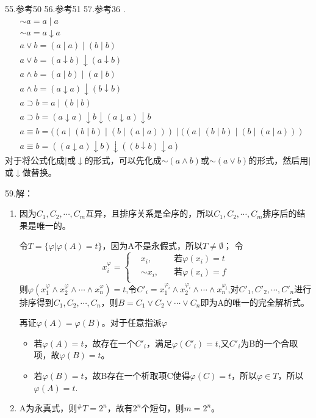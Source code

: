 \documentclass[a4paper]{ctexart}
\begin{document}
\noindent 55.参考50\newline
\noindent 56.参考51\newline
\noindent 57.参考36\newline
{}.
\begin{align*}
  &\sim a = a\mid a \\ 
  &\sim a = a \downarrow a\\
  &a\vee b = (a\mid a)\mid (b\mid b) \\
  &a\vee b =(a\downarrow b)\downarrow(a\downarrow b)\\
  &a\wedge b=(a\mid b)\mid (a\mid b) \\
  &a\wedge b=(a\downarrow a)\downarrow(b\downarrow b) \\
  &a\supset b=a\mid(b\mid b) \\ 
  &a\supset b=(a\downarrow a)\downarrow b\downarrow (a\downarrow a)\downarrow b \\
  &a\equiv b = ((a\mid(b\mid b)\mid(b\mid(a\mid a)))\mid ((a\mid(b\mid b)\mid(b\mid(a\mid a))) \\
  &a\equiv b = ((a\downarrow a)\downarrow b)\downarrow((b\downarrow b)\downarrow a)
\end{align*}
对于将公式化成$\mid$或$\downarrow$的形式，可以先化成$\sim(a\wedge b)$或$\sim(a\vee b)$的形式，然后用$\mid$或$\downarrow$做替换。\newline

\noindent 59.解：
\begin{enumerate}
  \item 因为$C_1,C_2,\cdots,C_m$互异，且排序关系是全序的，所以$C_1,C_2,\cdots,C_m$排序后的结果是唯一的。
  
  令$T=\{\varphi|\varphi(A)=t\}$，因为A不是永假式，所以$T\neq \emptyset$；
  令$$x_i^\varphi=
  \left\{
    \begin{aligned}
      &x_i,\quad &\text{若}\varphi(x_i)=t\\
      &\sim x_i, \quad &\text{若}\varphi(x_i)=f\\
    \end{aligned}
  \right.
  $$
  则$\varphi(x_1^\varphi\wedge x_2^\varphi\wedge\cdots \wedge x_n^\varphi)=t$,令$C'_i=x_1^{\varphi_i}\wedge x_2^{\varphi_i}\wedge\cdots \wedge x_n^{\varphi_i}$,对$C'_1,C'_2,\cdots,C'_n$进行排序得到$C_1,C_2,\cdots,C_n$，则$B=C_1\vee C_2\vee\cdots\vee C_n$即为A的唯一的完全解析式。
  
  再证$\varphi(A)=\varphi(B)$。对于任意指派$\varphi$
  \begin{itemize}
    \item 若$\varphi(A)=t$，故存在一个$C'_i$，满足$\varphi(C'_i)=t$,又$C'_i$为B的一个合取项，故$\varphi(B)=t$。
    \item 若$\varphi(B)=t$，故B存在一个析取项C使得$\varphi(C)=t$，所以$\varphi\in T$，所以$\varphi(A)=t$.
  \end{itemize}
  \item A为永真式，则$^\#T=2^n$，故有$2^n$个短句，则$m=2^n$。
\end{enumerate}
\end{document}
